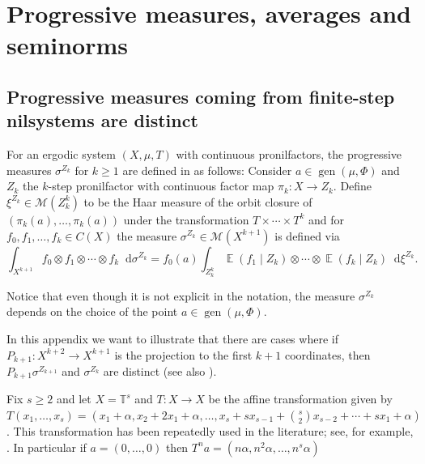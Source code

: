 \documentclass[letter, 11pt]{article}
\theoremstyle{definition}
\theoremstyle{plain}
\newcommand{\cM}{\mathcal{M}}
\DeclareMathOperator\gen{gen}
\newcommand{\T}{\mathbb{T}}
\newcommand*\diff{\mathop{}\!\mathrm{d}}
\newcommand{\1}{\mathbbm{1}}
\newcommand{\E}{\operatorname{\mathbb{E}}}
\begin{document}



\section{Progressive measures, averages and seminorms} \label{appendix progresive measures in Zk}

\subsection{Progressive measures coming from finite-step nilsystems are distinct}

For an ergodic system $(X,\mu,T)$ with continuous pronilfactors, the progressive measures $\sigma^{Z_{k}}$ for $k \geq 1$ are defined in \cite{kmrr25} as follows: Consider $a \in \gen (\mu, \Phi)$ and $Z_{k}$ the $k$-step pronilfactor with continuous factor map $\pi_{k} \colon X \to Z_k $. Define $\xi^{Z_k} \in \cM(Z_k^{k})$ to be the Haar measure of the orbit closure of $(\pi_k(a), \ldots, \pi_k(a))$ under the transformation $T \times \cdots \times T^{k}$ and for $f_0, f_1, \ldots, f_{k} \in C(X)$ the measure $\sigma^{Z_k} \in \cM(X^{k+1})$ is defined via
\begin{equation} \label{eq progressive measure in Zk}
    \int_{X^{k+1}} f_0 \otimes f_1 \otimes \cdots \otimes f_{k} \diff \sigma^{Z_k} = f_0(a) \int_{Z_k^{k}}  \E(f_1 \mid Z_k) \otimes \cdots \otimes \E(f_{k} \mid Z_k) \diff \xi^{Z_k}.
\end{equation}

Notice that even though it is not explicit in the notation, the measure $\sigma^{Z_{k}}$ depends on the choice of the point $a \in \gen (\mu, \Phi)$.

In this appendix we want to illustrate that there are cases where if $P_{k+1} \colon X^{k+2} \to X^{k+1}$ is the projection to the first $k+1$ coordinates, then $P_{k+1} \sigma^{Z_{k+1}}$ and $\sigma^{Z_{k}}$ are distinct (see also \cite[Example 3.19]{ackelsberg_jamnesham2025equidistribution}).


Fix $s \geq 2$ and let $X = \T^s $ and $T \colon X \to X$ be the affine transformation given by $T(x_1, \ldots,x_s) = (x_1 + \alpha, x_2 + 2 x_1 + \alpha, \ldots, x_s + s x_{s-1} + \binom{s}{2} x_{s-2} + \cdots + s x_1 + \alpha)$. This transformation has been repeatedly used in the literature; see, for example, \cite[Proposition 3.11]{Furstenberg81}. In particular if $a= (0,\ldots, 0)$ then $T^n a = (n \alpha, n^2 \alpha, \ldots, n^s \alpha)$
\end{document}
